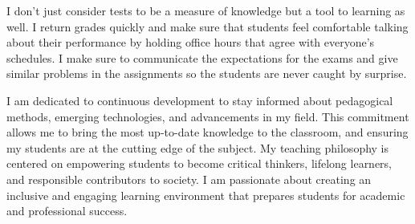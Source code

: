 \documentclass[
]{article}
\begin{document}
I don't just consider tests to be a measure of knowledge but a tool to
learning as well. I return grades quickly and make sure that students
feel comfortable talking about their performance by holding office hours
that agree with everyone's schedules. I make sure to communicate the
expectations for the exams and give similar problems in the assignments
so the students are never caught by surprise.

I am dedicated to continuous development to stay informed about
pedagogical methods, emerging technologies, and advancements in my
field. This commitment allows me to bring the most up-to-date knowledge
to the classroom, and ensuring my students are at the cutting edge of
the subject. My teaching philosophy is centered on empowering students
to become critical thinkers, lifelong learners, and responsible
contributors to society. I am passionate about creating an inclusive and
engaging learning environment that prepares students for academic and
professional success.
\end{document}
